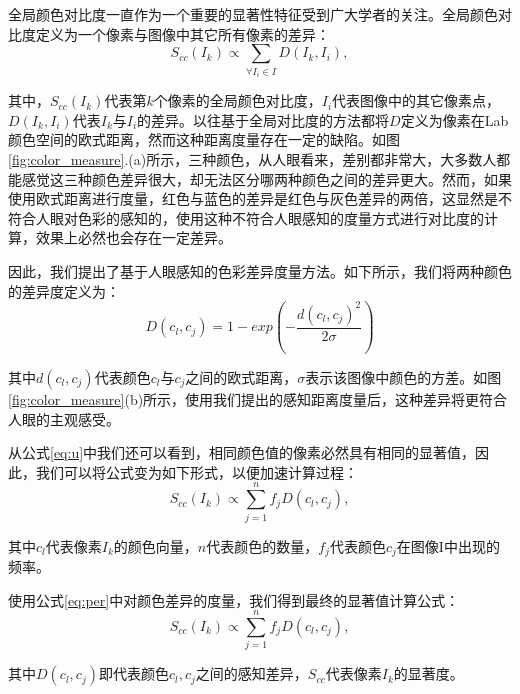 全局颜色对比度一直作为一个重要的显著性特征受到广大学者的关注\cite{ma2003contrast}\cite{liu2011learning}\cite{cheng2011global}。全局颜色对比度定义为一个像素与图像中其它所有像素的差异：
\begin{equation}
  S_{cc}(I_k) \propto \sum_{\forall{I_i \in I}} D(I_k, I_i) ,\label{eq:u}
\end{equation}

其中，$S_{cc}(I_k)$代表第$k$个像素的全局颜色对比度，$I_i$代表图像中的其它像素点，$D(I_k, I_i)$代表$I_k$与$I_i$的差异。以往基于全局对比度的方法都将$D$定义为像素在Lab颜色空间的欧式距离，然而这种距离度量存在一定的缺陷。如图\ref{fig:color_measure}.(a)所示，三种颜色，从人眼看来，差别都非常大，大多数人都能感觉这三种颜色差异很大，却无法区分哪两种颜色之间的差异更大。然而，如果使用欧式距离进行度量，红色与蓝色的差异是红色与灰色差异的两倍，这显然是不符合人眼对色彩的感知的，使用这种不符合人眼感知的度量方式进行对比度的计算，效果上必然也会存在一定差异。

因此，我们提出了基于人眼感知的色彩差异度量方法。如下所示，我们将两种颜色的差异度定义为：
\begin{equation}
  D(c_l, c_j) = 1 - exp(-\frac{d(c_l, c_j)^2}{2\sigma}) \label{eq:per}
\end{equation}

其中$d(c_l, c_j)$代表颜色$c_l$与$c_j$之间的欧式距离，$\sigma$表示该图像中颜色的方差。如图\ref{fig:color_measure}(b)所示，使用我们提出的感知距离度量后，这种差异将更符合人眼的主观感受。

从公式\ref{eq:u}中我们还可以看到，相同颜色值的像素必然具有相同的显著值，因此，我们可以将公式变为如下形式，以便加速计算过程：
\begin{equation}
  S_{cc}(I_k) \propto \sum_{j=1}^{n} f_j D(c_l, c_j),
\end{equation}

其中$c_l$代表像素$I_k$的颜色向量，$n$代表颜色的数量，$f_j$代表颜色$c_j$在图像I中出现的频率。

使用公式\ref{eq:per}中对颜色差异的度量，我们得到最终的显著值计算公式：
\begin{equation}
  S_{cc}(I_k) \propto \sum_{j=1}^{n} f_j D(c_l, c_j),
\end{equation}

其中$D(c_l, c_j)$即代表颜色$c_l,c_j$之间的感知差异，$S_{cc}$代表像素$I_k$的显著度。


